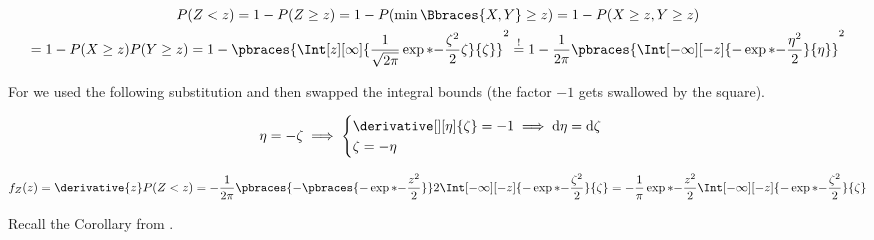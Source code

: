 \begin{solution}

\begin{multline*}
    P(Z < z)
    =
    1 - P(Z \geq z)
    =
    1 - P(\min \Bbraces{X, Y} \geq z)
    =
    1 - P(X \geq z, Y \geq z) \\
    =
    1 - P(X \geq z) P(Y \geq z)
    =
    1 - \pbraces{\Int[z][\infty]{\frac{1}{\sqrt{2 \pi}} \exp*{-\frac{\zeta^2}{2}}{\zeta}}{\zeta}}^2
    \stackrel{!}{=}
    1 - \frac{1}{2 \pi} \pbraces{\Int[-\infty][-z]{-\exp*{-\frac{\eta^2}{2}}}{\eta}}^2
\end{multline*}

For \Quote{!} we used the following substitution and then swapped the integral bounds (the factor $-1$ gets swallowed by the square).

\begin{align*}
    \eta = -\zeta
    \implies
    \begin{cases}
        \derivative[][\eta]{\zeta} = -1 \implies \mathrm d \eta = \mathrm d \zeta \\
        \zeta = -\eta
    \end{cases}
\end{align*}

\begin{align*}
    f_Z(z)
    =
    \derivative{z}
        P(Z < z)
    =
    -\frac{1}{2 \pi}
    \pbraces
    {
        -
        \pbraces
        {
            -\exp*{-\frac{z^2}{2}}
        }
    }
    2
    \Int[-\infty][-z]
    {
        -\exp*{-\frac{\zeta^2}{2}}
    }{\zeta}
    =
    -\frac{1}{\pi}
    \exp*{-\frac{z^2}{2}}
    \Int[-\infty][-z]
    {
        -\exp*{-\frac{\zeta^2}{2}}
    }{\zeta}
\end{align*}

Recall the Corollary from \cite[Lecture 3, Slide 42]{EStat}.


\end{solution}
